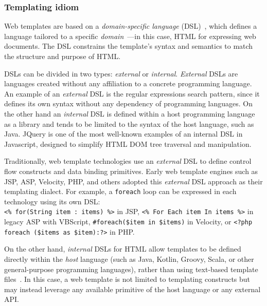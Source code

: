 
\subsubsection{Templating idiom}

Web templates are based on a \textit{domain-specific language}
(DSL)~\cite{landin1966next}, which defines a language tailored to a specific
\textit{domain}~\cite{evans2004domain}—in this case, HTML for expressing web
documents.
The DSL constrains the template's syntax and semantics to match the structure
and purpose of HTML.

DSLs can be divided in two types: \textit{external} or
\textit{internal}\cite{dslbook}.
\textit{External} DSLs are languages created without any affiliation to a
concrete programming language.
An example of an \textit{external} DSL is the regular expressions search
pattern\cite{thompson1968}, since it defines its own syntax without any
dependency of programming languages.
On the other hand an \textit{internal} DSL is defined within a host programming
language as a library and tends to be limited to the syntax of the host language,
such as Java.
JQuery\cite{resig2007pro} is one of the most well-known examples of an internal
DSL in Javascript, designed to simplify HTML DOM\cite{dom} tree traversal and
manipulation.

Traditionally, web template technologies use an \textit{external} DSL to define
control flow constructs and data binding primitives. Early web template engines
such as JSP, ASP, Velocity, PHP, and others adopted this \textit{external} DSL
approach as their templating dialect.
For example, a \texttt{foreach} loop can be expressed in each technology using its
own DSL:
\\\texttt{<\% for(String item : items) \%>} in JSP, \texttt{<\% For Each item
In items \%>} in legacy ASP with VBScript, \texttt{\#foreach(\$item in \$items)} in
Velocity, or \texttt{<?php foreach (\$items as \$item):?>} in PHP.

On the other hand, \textit{internal} DSLs for HTML allow templates to be defined
directly within the \emph{host} language (such as Java, Kotlin, Groovy, Scala, or
other general-purpose programming languages), rather than using text-based
template files~\cite{carvalho2019hot}. In this case, a web template is not limited
to templating constructs but may instead leverage any available primitive of the
host language or any external API.

